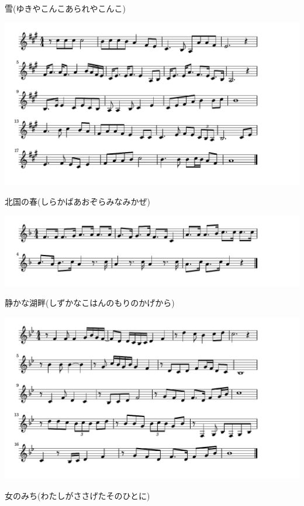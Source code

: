 \documentclass[a4paper]{ltjsarticle}
\begin{document}
\vspace{-10mm} \hspace{10mm}
雪(ゆきやこんこあられやこんこ)

\includegraphics[clip]{kitaguninoharu_crop.pdf}

\vspace{-10mm} \hspace{10mm}
北国の春(しらかばあおぞらみなみかぜ)

\includegraphics[clip]{shizukanakohan_crop.pdf}

\vspace{-10mm} \hspace{10mm}
静かな湖畔(しずかなこはんのもりのかげから)

\includegraphics[clip]{onnanomichi_crop.pdf}

\vspace{-10mm} \hspace{10mm}
女のみち(わたしがささげたそのひとに)
\end{document}
